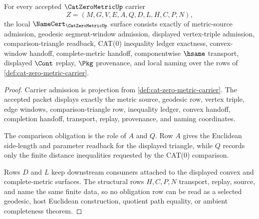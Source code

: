 \begin{theorem}
\label{thm:cat-zero-metric-comparison-obligations}
For every accepted $\CatZeroMetricUp$ carrier
$$
Z=(M,G,V,E,A,Q,D,L,H,C,P,N),
$$
the local $\NameCert_{\CatZeroMetricUp}$ surface consists exactly of metric-source admission, geodesic segment-window admission, displayed vertex-triple admission, comparison-triangle readback, CAT(0) inequality ledger exactness, convex-window handoff, complete-metric handoff, componentwise $\hsame$ transport, displayed $\Cont$ replay, $\Pkg$ provenance, and local naming over the rows of \autoref{def:cat-zero-metric-carrier}.
\end{theorem}
\begin{proof}
Carrier admission is projection from \autoref{def:cat-zero-metric-carrier}. The accepted packet displays exactly the metric source, geodesic row, vertex triple, edge windows, comparison-triangle row, inequality ledger, convex handoff, completion handoff, transport, replay, provenance, and naming coordinates.

The comparison obligation is the role of $A$ and $Q$. Row $A$ gives the Euclidean side-length and parameter readback for the displayed triangle, while $Q$ records only the finite distance inequalities requested by the CAT(0) comparison.

Rows $D$ and $L$ keep downstream consumers attached to the displayed convex and complete-metric surfaces. The structural rows $H,C,P,N$ transport, replay, source, and name the same finite data, so no obligation row can be read as a selected geodesic, host Euclidean construction, quotient path equality, or ambient completeness theorem.
\end{proof}

